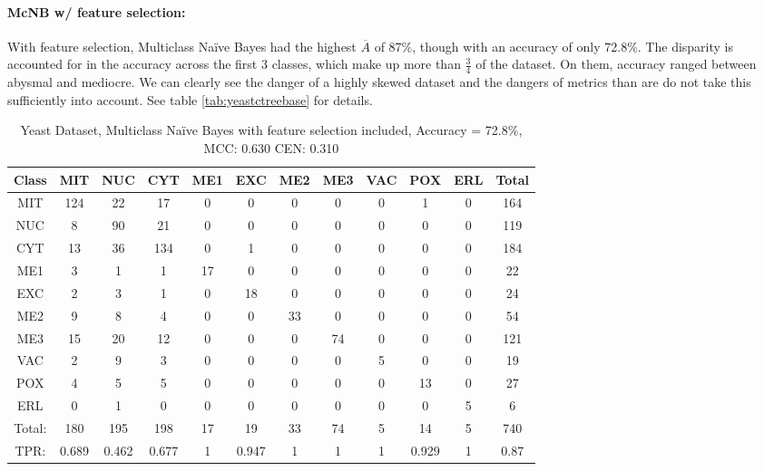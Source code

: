 \paragraph{McNB w/ feature selection:}
With feature selection, Multiclass Na\"ive Bayes had the highest $\overline{A}$ of 87\%, though with an accuracy of only 72.8\%.  The disparity is accounted for in the accuracy across the first 3 classes, which make up more than $\frac{3}{4}$ of the dataset.  On them, accuracy ranged between abysmal and mediocre.  We can clearly see the danger of a highly skewed dataset and the dangers of metrics than are do not take this sufficiently into account.  See table \ref{tab:yeastctreebase} for details.
\\
\begin{table}[h!]
\begin{tabular}{|c|c|c|c|c|c|c|c|c|c|c|c|}
	\hline
Class&MIT&NUC&CYT&ME1&EXC&ME2&ME3&VAC&POX&ERL&Total\\
\hline
MIT&124&22&17&0&0&0&0&0&1&0&164\\
NUC&8&90&21&0&0&0&0&0&0&0&119\\
CYT&13&36&134&0&1&0&0&0&0&0&184\\
ME1&3&1&1&17&0&0&0&0&0&0&22\\
EXC&2&3&1&0&18&0&0&0&0&0&24\\
ME2&9&8&4&0&0&33&0&0&0&0&54\\
ME3&15&20&12&0&0&0&74&0&0&0&121\\
VAC&2&9&3&0&0&0&0&5&0&0&19\\
POX&4&5&5&0&0&0&0&0&13&0&27\\
ERL&0&1&0&0&0&0&0&0&0&5&6\\
\hline
Total:&180&195&198&17&19&33&74&5&14&5&740\\
TPR:&0.689&0.462&0.677&1&0.947&1&1&1&0.929&1&0.87\\
\hline
\end{tabular}
\caption[Yeast: Multiclass Na\"ive Bayes with Feature Selection Confusion Matrix]{Yeast Dataset, Multiclass Na\"ive Bayes with feature selection included, Accuracy = 72.8\%, MCC: 0.630 CEN: 0.310}
\label{tab:yeastmcnbfeatures}
\end{table}



